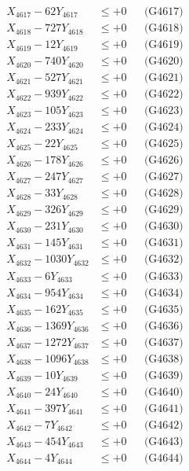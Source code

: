 \documentclass[a4paper,10pt]{article}
\begin{document}
{\begin{align}
X_{4617} - 62Y_{4617} &\leq +0 && \text{(G4617)} \\
X_{4618} - 727Y_{4618} &\leq +0 && \text{(G4618)} \\
X_{4619} - 12Y_{4619} &\leq +0 && \text{(G4619)} \\
X_{4620} - 740Y_{4620} &\leq +0 && \text{(G4620)} \\
\allowbreak
X_{4621} - 527Y_{4621} &\leq +0 && \text{(G4621)} \\
X_{4622} - 939Y_{4622} &\leq +0 && \text{(G4622)} \\
X_{4623} - 105Y_{4623} &\leq +0 && \text{(G4623)} \\
X_{4624} - 233Y_{4624} &\leq +0 && \text{(G4624)} \\
X_{4625} - 22Y_{4625} &\leq +0 && \text{(G4625)} \\
X_{4626} - 178Y_{4626} &\leq +0 && \text{(G4626)} \\
X_{4627} - 247Y_{4627} &\leq +0 && \text{(G4627)} \\
X_{4628} - 33Y_{4628} &\leq +0 && \text{(G4628)} \\
X_{4629} - 326Y_{4629} &\leq +0 && \text{(G4629)} \\
X_{4630} - 231Y_{4630} &\leq +0 && \text{(G4630)} \\
\allowbreak
X_{4631} - 145Y_{4631} &\leq +0 && \text{(G4631)} \\
X_{4632} - 1030Y_{4632} &\leq +0 && \text{(G4632)} \\
X_{4633} - 6Y_{4633} &\leq +0 && \text{(G4633)} \\
X_{4634} - 954Y_{4634} &\leq +0 && \text{(G4634)} \\
X_{4635} - 162Y_{4635} &\leq +0 && \text{(G4635)} \\
X_{4636} - 1369Y_{4636} &\leq +0 && \text{(G4636)} \\
X_{4637} - 1272Y_{4637} &\leq +0 && \text{(G4637)} \\
X_{4638} - 1096Y_{4638} &\leq +0 && \text{(G4638)} \\
X_{4639} - 10Y_{4639} &\leq +0 && \text{(G4639)} \\
X_{4640} - 24Y_{4640} &\leq +0 && \text{(G4640)} \\
\allowbreak
X_{4641} - 397Y_{4641} &\leq +0 && \text{(G4641)} \\
X_{4642} - 7Y_{4642} &\leq +0 && \text{(G4642)} \\
X_{4643} - 454Y_{4643} &\leq +0 && \text{(G4643)} \\
X_{4644} - 4Y_{4644} &\leq +0 && \text{(G4644)} \\

\end{align}}
\end{document}
